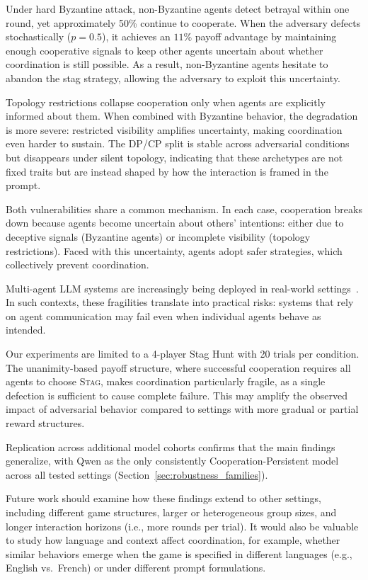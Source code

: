 \documentclass[runningheads]{llncs}
\newcommand{\tsc}[1]{\textsc{#1}}
\begin{document}
Under hard Byzantine attack, non-Byzantine agents detect betrayal within one round, yet approximately 50\% continue to cooperate. When the adversary defects stochastically ($p{=}0.5$), it achieves an $11\%$ payoff advantage by maintaining enough cooperative signals to keep other agents uncertain about whether coordination is still possible. As a result, non-Byzantine agents hesitate to abandon the stag strategy, allowing the adversary to exploit this uncertainty.

Topology restrictions collapse cooperation only when agents are explicitly informed about them. When combined with Byzantine behavior, the degradation is more severe: restricted visibility amplifies uncertainty, making coordination even harder to sustain. The DP/CP split is stable across adversarial conditions but disappears under silent topology, indicating that these archetypes are not fixed traits but are instead shaped by how the interaction is framed in the prompt.

Both vulnerabilities share a common mechanism. In each case, cooperation breaks down because agents become uncertain about others' intentions: either due to deceptive signals (Byzantine agents) or incomplete visibility (topology restrictions). Faced with this uncertainty, agents adopt safer strategies, which collectively prevent coordination.

Multi-agent LLM systems are increasingly being deployed in real-world settings~\cite{wu2023autogen}. In such contexts, these fragilities translate into practical risks: systems that rely on agent communication may fail even when individual agents behave as intended.

Our experiments are limited to a 4-player Stag Hunt with 20 trials per condition. The unanimity-based payoff structure, where successful cooperation requires all agents to choose \tsc{Stag}, makes coordination particularly fragile, as a single defection is sufficient to cause complete failure. This may amplify the observed impact of adversarial behavior compared to settings with more gradual or partial reward structures.

Replication across additional model cohorts confirms that the main findings generalize, with Qwen as the only consistently Cooperation-Persistent model across all tested settings (Section~\ref{sec:robustness_families}).

Future work should examine how these findings extend to other settings, including different game structures, larger or heterogeneous group sizes, and longer interaction horizons (i.e., more rounds per trial). It would also be valuable to study how language and context affect coordination, for example, whether similar behaviors emerge when the game is specified in different languages (e.g., English vs.\ French) or under different prompt formulations.
\end{document}
